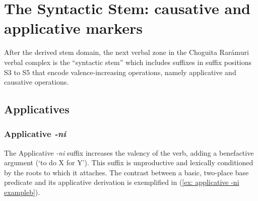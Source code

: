 \section{The Syntactic Stem: causative and applicative markers}
\label{sec: the syntactic stem}

After the derived stem domain, the next verbal zone in the Choguita Rarámuri verbal complex is the ``syntactic stem'' which includes suffixes in suffix positions S3 to S5 that encode valence-increasing operations, namely applicative and causative operations.

\subsection{Applicatives}
\label{subsec: applicatives}

\subsubsection{Applicative \textit{-ni}}
\label{subsubsec: applicative ni}

The Applicative \textit{-ni} suffix increases the valency of the verb, adding a benefactive argument (‘to do X for Y’). This suffix is unproductive and lexically conditioned by the roots to which it attaches. The contrast between a basic, two-place base predicate and its applicative derivation is exemplified in (\ref{ex: applicative -ni exampleb}).

\ea\label{ex: applicative -ni example}

    \label{ex: applicative -ni examplea}
        \label{ex: applicative -ni exampleb}
    \z
\z


